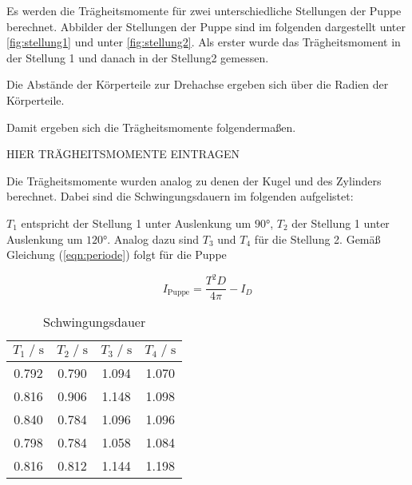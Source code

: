 Es werden die Trägheitsmomente für zwei unterschiedliche Stellungen der Puppe berechnet. Abbilder der Stellungen der Puppe sind im folgenden
dargestellt unter \autoref{fig:stellung1} und unter \autoref{fig:stellung2}. 
Als erster wurde das Trägheitsmoment in der Stellung 1 und danach in der Stellung2 gemessen.




Die Abstände der Körperteile zur Drehachse ergeben sich über die Radien der Körperteile.

Damit ergeben sich die Trägheitsmomente folgendermaßen.
\begin{center}
  HIER TRÄGHEITSMOMENTE EINTRAGEN
\end{center}

Die Trägheitsmomente wurden analog zu denen der Kugel und des Zylinders berechnet. Dabei sind die Schwingungsdauern im folgenden
aufgelistet:

$T_1$ entspricht der Stellung 1 unter Auslenkung um $90°$, $T_2$ der Stellung 1 unter Auslenkung um $120°$.
Analog dazu sind $T_3$ und $T_4$ für die Stellung 2. Gemäß Gleichung (\autoref{eqn:periode}) folgt für die Puppe


\begin{equation}
  I_{\text{Puppe}} = \frac{T^2D}{4\pi} - I_D
\end{equation}

\begin{table}
    \centering
        \caption{Schwingungsdauer}
        \label{tab:schwingdauer}
        \begin{tabular}{c c c c}
        \toprule
        $T_1 \;/\; \si{\second}$ & $T_2 \;/\; \si{\second}$ & $T_3 \;/\; \si{\second}$ & $T_4 \;/\; \si{\second}$ \\
        \midrule
        0.792 & 0.790 & 1.094 & 1.070 \\
        0.816 & 0.906 & 1.148 & 1.098 \\
        0.840 & 0.784 & 1.096 & 1.096 \\
        0.798 & 0.784 & 1.058 & 1.084 \\
        0.816 & 0.812 & 1.144 & 1.198 \\
        \bottomrule
    \end{tabular}
\end{table}

